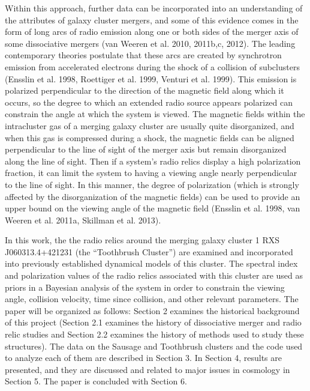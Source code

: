 \message{ !name(THESIS_LATEX_WHAT_THE_HECK.tex)}\documentclass[12 pt]{article}
\begin{document}
Within this approach, further data can be incorporated into an understanding of the attributes of galaxy cluster mergers, and some of this evidence comes in the form of long arcs of radio emission along one or both sides of the merger axis of some dissociative mergers (van Weeren et al. 2010, 2011b,c, 2012). The leading contemporary theories postulate that these arcs are created by synchrotron emission from accelerated electrons during the shock of a collision of subclusters (Ensslin et al. 1998, Roettiger et al. 1999, Venturi et al. 1999). This emission is polarized perpendicular to the direction of the magnetic field along which it occurs, so the degree to which an extended radio source appears polarized can constrain the angle at which the system is viewed. The magnetic fields within the intracluster gas of a merging galaxy cluster are usually quite disorganized, and when this gas is compressed during a shock, the magnetic fields can be aligned perpendicular to the line of sight of the merger axis but remain disorganized along the line of sight. Then if a system's radio relics display a high polarization fraction, it can limit the system to having a viewing angle nearly perpendicular to the line of sight. In this manner, the degree of polarization (which is strongly affected by the disorganization of the magnetic fields) can be used to provide an upper bound on the viewing angle of the magnetic field (Ensslin et al. 1998, van Weeren et al. 2011a, Skillman et al. 2013).

In this work, the the radio relics around the merging galaxy cluster 1 RXS J060313.4+421231 (the “Toothbrush Cluster”) are examined and incorporated into previously established dynamical models of this cluster. The spectral index and polarization values of the radio relics associated with this cluster are used as priors in a Bayesian analysis of the system in order to constrain the viewing angle, collision velocity, time since collision, and other relevant parameters. The paper will be organized as follows: Section 2 examines the historical background of this project (Section 2.1 examines the history of dissociative merger and radio relic studies and Section 2.2 examines the history of methods used to study these structures). The data on the Sausage and Toothbrush clusters and the code used to analyze each of them are described in Section 3. In Section 4, results are presented, and they are discussed and related to major issues in cosmology in Section 5. The paper is concluded with Section 6. 

\end{document}
